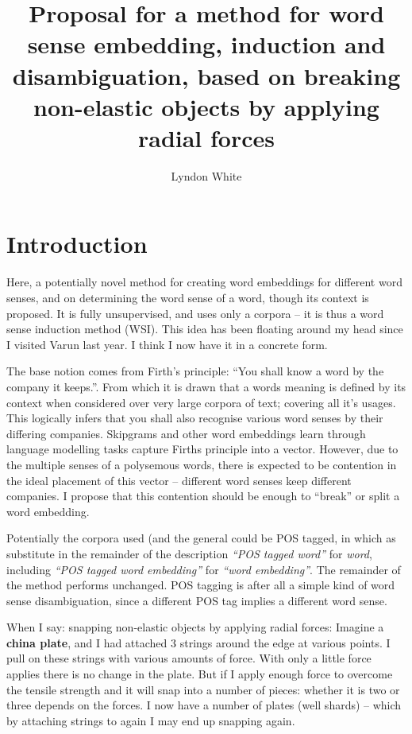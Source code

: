 \documentclass{article}
\title{Proposal for a method for word sense embedding, induction and disambiguation, based on breaking non-elastic objects by applying radial forces}
\author{Lyndon White}
\begin{document}
\maketitle

\section{Introduction}

Here, a potentially novel method for creating word embeddings for different word senses, and on determining the word sense of a word, though its context is proposed. It is fully unsupervised, and uses only a corpora -- it is thus a word sense induction method (WSI).
This idea has been floating around my head since I visited Varun last year. I think I now have it in a concrete form.


The base notion comes from Firth's principle: ``You shall know a word by the company it keeps.''. From which it is drawn that a words meaning is defined by its context when considered over very large corpora of text; covering all it's usages. This logically infers that you shall also recognise various word senses by their differing companies.
Skipgrams and other word embeddings learn through language modelling tasks capture Firths principle into a vector. 
However, due to the multiple senses of a polysemous words, there is expected to be contention in the ideal placement of this vector -- different word senses keep different companies.
I propose that this contention should be enough to ``break'' or split a word embedding.



Potentially the corpora used (and the general could be POS tagged, in which as substitute in the remainder of the description \emph{``POS tagged word''} for \emph{word}, including \emph{``POS tagged word embedding''} for \emph{``word embedding''}. The remainder of the method performs unchanged. POS tagging is after all a simple kind of word sense disambiguation, since a different POS tag implies a different word sense.

When I say: snapping non-elastic objects by applying radial forces:
Imagine a \textbf{china plate}, and I had attached 3 strings around the edge at various points. I pull on these strings with various amounts of force. With only a little force applies there is no change in the plate. But if I apply enough force to overcome the tensile strength and it will snap into a number of pieces: whether it is two or three depends on the forces. I now have a number of plates (well shards) -- which by attaching strings to again I may end up snapping again.
\end{document}
